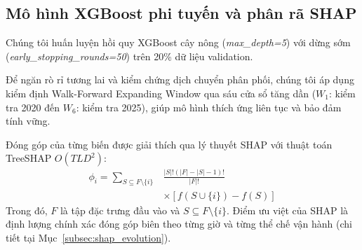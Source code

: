 \subsection{Mô hình XGBoost phi tuyến và phân rã SHAP}

Chúng tôi huấn luyện hồi quy XGBoost \citep{chen2016} cây nông (\textit{max\_depth=5}) với dừng sớm (\textit{early\_stopping\_rounds=50}) trên 20\% dữ liệu validation.

Để ngăn rò rỉ tương lai và kiểm chứng dịch chuyển phân phối, chúng tôi áp dụng kiểm định Walk-Forward Expanding Window qua sáu cửa sổ tăng dần ($W_1$: kiểm tra 2020 đến $W_6$: kiểm tra 2025), giúp mô hình thích ứng liên tục và bảo đảm tính vững.

Đóng góp của từng biến được giải thích qua lý thuyết SHAP \citep{lundberg2017} với thuật toán TreeSHAP $O(TLD^2)$:
\begin{equation}
\begin{split}
\phi_i = \sum_{S \subseteq F \setminus \{i\}} &\frac{|S|!(|F|-|S|-1)!}{|F|!} \\
&\times [f(S \cup \{i\}) - f(S)]
\end{split}
\end{equation}
Trong đó, $F$ là tập đặc trưng đầu vào và $S \subseteq F \setminus \{i\}$. Điểm ưu việt của SHAP là định lượng chính xác đóng góp biên theo từng giờ và từng thể chế vận hành (chi tiết tại Mục~\ref{subsec:shap_evolution}).


